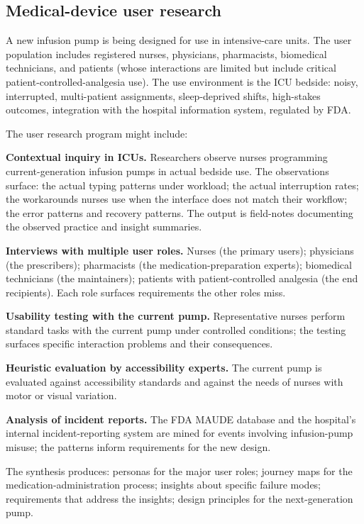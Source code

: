 \subsection*{Medical-device user research}

A new infusion pump is being designed for use in intensive-care units. The user population includes registered nurses, physicians, pharmacists, biomedical technicians, and patients (whose interactions are limited but include critical patient-controlled-analgesia use). The use environment is the ICU bedside: noisy, interrupted, multi-patient assignments, sleep-deprived shifts, high-stakes outcomes, integration with the hospital information system, regulated by FDA.

The user research program might include:

\textbf{Contextual inquiry in ICUs.} Researchers observe nurses programming current-generation infusion pumps in actual bedside use. The observations surface: the actual typing patterns under workload; the actual interruption rates; the workarounds nurses use when the interface does not match their workflow; the error patterns and recovery patterns. The output is field-notes documenting the observed practice and insight summaries.

\textbf{Interviews with multiple user roles.} Nurses (the primary users); physicians (the prescribers); pharmacists (the medication-preparation experts); biomedical technicians (the maintainers); patients with patient-controlled analgesia (the end recipients). Each role surfaces requirements the other roles miss.

\textbf{Usability testing with the current pump.} Representative nurses perform standard tasks with the current pump under controlled conditions; the testing surfaces specific interaction problems and their consequences.

\textbf{Heuristic evaluation by accessibility experts.} The current pump is evaluated against accessibility standards and against the needs of nurses with motor or visual variation.

\textbf{Analysis of incident reports.} The FDA MAUDE database and the hospital's internal incident-reporting system are mined for events involving infusion-pump misuse; the patterns inform requirements for the new design.

The synthesis produces: personas for the major user roles; journey maps for the medication-administration process; insights about specific failure modes; requirements that address the insights; design principles for the next-generation pump.

